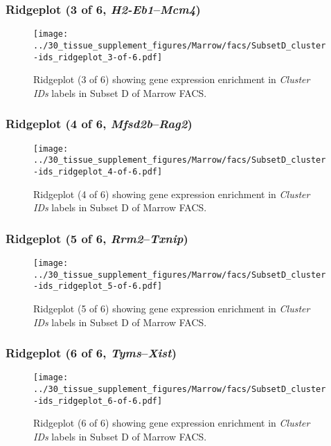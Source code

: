 \clearpage

\subsubsection{Ridgeplot (3 of 6, \emph{H2-Eb1}--\emph{Mcm4})}
\begin{figure}[h]
\centering
\texttt{[image: ../30\_tissue\_supplement\_figures/Marrow/facs/SubsetD\_cluster-ids\_ridgeplot\_3-of-6.pdf]}

\caption{ Ridgeplot (3 of 6)  showing gene expression enrichment in \emph{Cluster IDs} labels in Subset D of Marrow FACS. }
\end{figure}


\clearpage

\subsubsection{Ridgeplot (4 of 6, \emph{Mfsd2b}--\emph{Rag2})}
\begin{figure}[h]
\centering
\texttt{[image: ../30\_tissue\_supplement\_figures/Marrow/facs/SubsetD\_cluster-ids\_ridgeplot\_4-of-6.pdf]}

\caption{ Ridgeplot (4 of 6)  showing gene expression enrichment in \emph{Cluster IDs} labels in Subset D of Marrow FACS. }
\end{figure}


\clearpage

\subsubsection{Ridgeplot (5 of 6, \emph{Rrm2}--\emph{Txnip})}
\begin{figure}[h]
\centering
\texttt{[image: ../30\_tissue\_supplement\_figures/Marrow/facs/SubsetD\_cluster-ids\_ridgeplot\_5-of-6.pdf]}

\caption{ Ridgeplot (5 of 6)  showing gene expression enrichment in \emph{Cluster IDs} labels in Subset D of Marrow FACS. }
\end{figure}


\clearpage

\subsubsection{Ridgeplot (6 of 6, \emph{Tyms}--\emph{Xist})}
\begin{figure}[h]
\centering
\texttt{[image: ../30\_tissue\_supplement\_figures/Marrow/facs/SubsetD\_cluster-ids\_ridgeplot\_6-of-6.pdf]}

\caption{ Ridgeplot (6 of 6)  showing gene expression enrichment in \emph{Cluster IDs} labels in Subset D of Marrow FACS. }
\end{figure}


